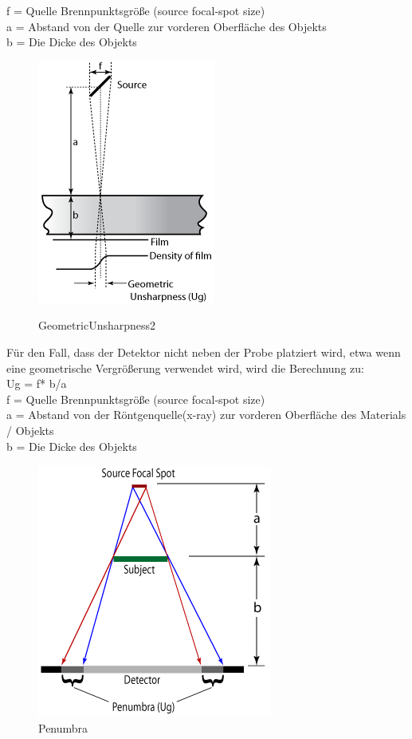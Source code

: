 f = Quelle Brennpunktsgröße (source focal-spot size) \\
a = Abstand von der Quelle zur vorderen Oberfläche des Objekts\\
b = Die Dicke des Objekts\\
\begin{figure}[htb]
  \includegraphics[scale=0.9]{img/GeometricUnsharpness2.png}\\
  \caption{GeometricUnsharpness2}
  \label{sec:geometricUnsharpness}
  \end{figure}
Für den Fall, dass der Detektor nicht neben der Probe platziert wird, etwa wenn eine geometrische Vergrößerung verwendet wird, wird die Berechnung zu:\\

Ug = f* b/a\\
f = Quelle Brennpunktsgröße (source focal-spot size) \\
a = Abstand von der Röntgenquelle(x-ray) zur vorderen Oberfläche des Materials / Objekts\\
b = Die Dicke des Objekts\\
\begin{figure}[htb]
  \centering 
 \includegraphics[scale=0.9]{img/Penumbra.png}
 \caption{Penumbra}
  \label{fig:Penumbra}
\end{figure}

